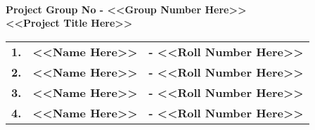 \begin{titlepage}

\begin{center}


~\\[5cm] %
\fontsize{12.6468mm}{1mm} \textbf{Project Group No - <<Group Number Here>>}\\[2cm]

\fontsize{15.4572mm}{1mm} \textbf{<<Project Title Here>>}\\[2cm]

\begin{table}[h]\Huge
\centering
\begin{tabular}{>{\bfseries}l>{\bfseries}l>{\bfseries}r}
1. & <<Name Here>> & - <<Roll Number Here>>\\ 
2. & <<Name Here>> & - <<Roll Number Here>>\\
3. & <<Name Here>> & - <<Roll Number Here>>\\
4. & <<Name Here>> & - <<Roll Number Here>>\\ %
\end{tabular}
\end{table}

\end{center}

\end{titlepage}
